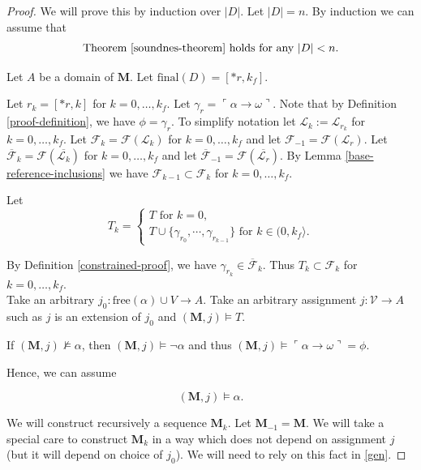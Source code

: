 \documentclass[10pt]{article}
\theoremstyle{plain}
\newcommand{\free}{\text{free}}
\newcommand{\F}{\mathcal{F}}
\newcommand{\final}{\text{final}}
\renewcommand{\L}{\mathscr{L}}
\newcommand{\V}{\mathscr{V}}
\newcommand{\M}{\mathbf{M}}
\begin{document}
\begin{proof}
We will prove this by induction over $|D|$. Let $|D| = n$. By induction we can assume that 
\begin{equation}
\label{induction-1}
\text{Theorem \ref{soundnes-theorem} holds for any } |D| < n.
\end{equation}

Let $A$ be a domain of $\M$. Let $\final(D) = [*r, k_f]$.

Let $r_k = [*r, k]$ for $k=0, \dots, k_f$. Let $\gamma_r = \ulcorner \alpha\to\omega \urcorner$. Note that by Definition \ref{proof-definition}, we have $\phi = \gamma_r$. To simplify notation let $\L_k := \L_{r_k}$ for $k=0, \dots, k_f$.  
Let $\F_k = \F(\L_k)$ for $k=0, \dots, k_f$ and let $\F_{-1} = \F(\L_r)$.
Let $\overline{\F}_k = \F(\overline{\L_k})$ for $k=0, \dots, k_f$ and let $\overline{\F}_{-1} = \F(\overline{\L_r})$. 
By Lemma \ref{base-reference-inclusions} we have $\F_{k-1} \subset \F_k$ for $k=0, \dots, k_f$.

Let
\begin{equation}
T_k = 
\begin{cases}
T \text{ for } k = 0,\\
T\cup \{ \gamma_{r_0}, \cdots, \gamma_{r_{k - 1}}\} \text{ for } 
k \in (0, k_f\rangle.
\end{cases}
\end{equation}

By Definition \ref{constrained-proof}, we have $\gamma_{r_k}\in \overline{\F}_k$. 
Thus $T_k \subset \F_k$ for $k=0,\dots,k_f$.
\\

Take an arbitrary $j_0: \free(\alpha)\cup V\to A$.  
Take an arbitrary assignment $j:\V\to A$ such as $j$ is an extension of $j_0$ and $(\M, j)\models T$.

If $(\M,j)\not\models \alpha$, then $(\M,j)\models \neg\alpha$ and thus $(\M,j)\models \ulcorner \alpha\to\omega \urcorner = \phi$.

Hence, we can assume 

\begin{equation}
\label{assumption-alpha}
(\M,j)\models \alpha.
\end{equation}
 
We will construct recursively a sequence $\M_k$. Let $\M_{-1} = \M$.
We will take a special care to construct $\M_k$ in a way which does not depend on assignment $j$ (but it will depend on choice of $j_0$). We will need to rely on this fact in \ref{gen}.


\end{proof}
\end{document}
